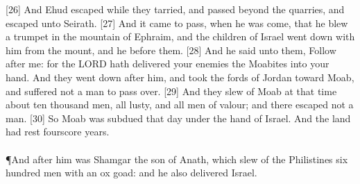 [26] \textcolor[cmyk]{0.99998,1,0,0}{And Ehud escaped while they tarried, and passed beyond the quarries, and escaped unto Seirath.}
[27] \textcolor[cmyk]{0.99998,1,0,0}{And it came to pass, when he was come, that he blew a trumpet in the mountain of Ephraim, and the children of Israel went down with him from the mount, and he before them.}
[28] \textcolor[cmyk]{0.99998,1,0,0}{And he said unto them, Follow after me: for the LORD hath delivered your enemies the Moabites into your hand. And they went down after him, and took the fords of Jordan toward Moab, and suffered not a man to pass over.}
[29] \textcolor[cmyk]{0.99998,1,0,0}{And they slew of Moab at that time about ten thousand men, all lusty, and all men of valour; and there escaped not a man.}
[30] \textcolor[cmyk]{0.99998,1,0,0}{So Moab was subdued that day under the hand of Israel. And the land had rest fourscore years.}\\
\\
\P \textcolor[cmyk]{0.99998,1,0,0}{And after him was Shamgar the son of Anath, which slew of the Philistines six hundred men with an ox goad: and he also delivered Israel.}